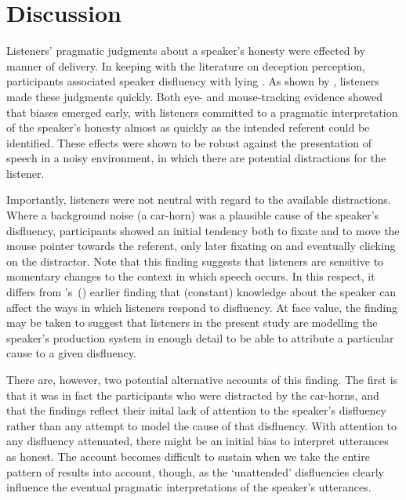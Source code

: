 \documentclass[a4paper,man,natbib]{apa6}
\newcommand*{\citegen}[1]{\citeauthor{#1}'s~(\citeyear{#1})}
\begin{document}
\section{Discussion}
Listeners' pragmatic judgments about a speaker's honesty were effected by manner of delivery.
In keeping with the literature on deception perception, participants associated speaker disfluency with lying \citep{Zuckerman1981,depaulo2003cues}. 
As shown by \citet{Loy2016}, listeners made these judgments quickly.
Both eye- and mouse-tracking evidence showed that biases emerged early, with listeners committed to a pragmatic interpretation of the speaker's honesty almost as quickly as the intended referent could be identified.
These effects were shown to be robust against the presentation of speech in a noisy environment, in which there are potential distractions for the listener.

Importantly, listeners were not neutral with regard to the available distractions.
Where a background noise (a car-horn) was a plausible cause of the speaker's disfluency, participants showed an  initial tendency both to fixate and to move the mouse pointer towards the referent, only later fixating on and eventually clicking on the distractor.
Note that this finding suggests that listeners are sensitive to momentary changes to the context in which speech occurs.
In this respect, it differs from \citegen{Arnold2007} earlier finding that (constant) knowledge about the speaker can affect the ways in which listeners respond to disfluency.
At face value, the finding may be taken to suggest that listeners in the present study are modelling the speaker's production system in enough detail to be able to attribute a particular cause to a given disfluency.

There are, however, two potential alternative accounts of this finding.
The first is that it was in fact the participants who were distracted by the car-horns, and that the findings reflect their inital lack of attention to the speaker's disfluency rather than any attempt to model the cause of that disfluency.
With attention to any disfluency attenuated, there might be an initial bias to interpret utterances as honest.
The account becomes difficult to sustain when we take the entire pattern of results into account, though, as the `unattended' disfluencies clearly influence the eventual pragmatic interpretations of the speaker's utterances.
\end{document}
